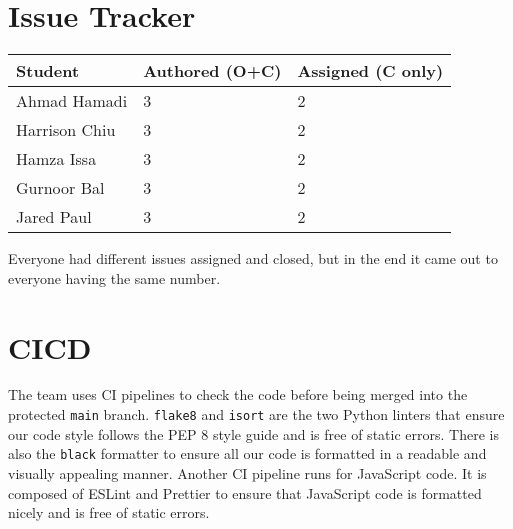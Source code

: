 \documentclass{article}
\begin{document}

\section{Issue Tracker}


\begin{table}[H]
\centering
\begin{tabular}{lll}
\toprule
\textbf{Student} & \textbf{Authored (O+C)} & \textbf{Assigned (C only)}\\
\midrule
Ahmad Hamadi & 3 & 2 \\
Harrison Chiu & 3 & 2 \\
Hamza Issa & 3 & 2 \\
Gurnoor Bal & 3 & 2 \\
Jared Paul & 3 & 2 \\
\bottomrule
\end{tabular}
\end{table}

Everyone had different issues assigned and closed, but in the end it came out to everyone having the same number.

\section{CICD}

The team uses CI pipelines to check the code before being merged into the protected \verb|main| branch. 
\verb|flake8| and \verb|isort| are the two Python linters that ensure our code style follows the PEP 8 
style guide and is free of static errors. There is also the \verb|black| formatter to ensure all our code
is formatted in a readable and visually appealing manner. Another CI pipeline runs for JavaScript code.
It is composed of ESLint and Prettier to ensure that JavaScript code is formatted nicely and is free of 
static errors.
\end{document}
